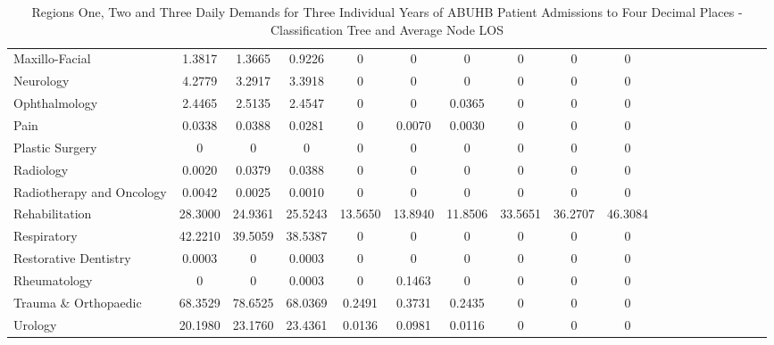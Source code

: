 \documentclass[thesis.tex]{subfiles}
\begin{document}
\begin{landscape}
\begin{table}[h!]
{\begin{tabular}{lcccccccccccccccccc}
Maxillo-Facial&	1.3817&	1.3665&	0.9226&	0&	0&	0	&0&	0	&0\\
Neurology&	4.2779&	3.2917	&3.3918&	0	&0&	0&	0&	0&	0\\
Ophthalmology	&2.4465&	2.5135	&2.4547	&0	&0	&0.0365	&0	&0&	0\\
Pain&	0.0338	&0.0388&	0.0281	&0	&0.0070	&0.0030	&0	&0	&0\\
Plastic Surgery	&0	&0	&0	&0	&0	&0	&0	&0&	0\\
Radiology&	0.0020	&0.0379	&0.0388&	0&	0&	0&	0	&0	&0\\
Radiotherapy and Oncology&	0.0042&	0.0025	&0.0010&	0&	0&	0	&0	&0	&0\\
Rehabilitation&	28.3000	&24.9361	&25.5243	&13.5650&	13.8940	&11.8506	&33.5651	&36.2707	&46.3084\\
Respiratory&	42.2210&	39.5059&	38.5387&	0&	0&	0&	0	&0&	0\\
Restorative Dentistry	&0.0003&	0&	0.0003	&0	&0	&0&	0	&0	&0\\
Rheumatology	&0&	0	&0.0003&0&	0.1463&	0&	0&	0&	0\\
Trauma \& Orthopaedic&	68.3529&	78.6525	&68.0369&	0.2491&	0.3731	&0.2435&	0&	0&	0\\
Urology	&20.1980&	23.1760&	23.4361	&0.0136	&0.0981&	0.0116	&0	&0	&0\\\bottomrule
    \end{tabular}  } 
\caption{Regions One, Two and Three Daily Demands for Three Individual Years of ABUHB Patient Admissions to Four Decimal Places - Classification Tree and Average Node LOS}
    \label{apptab:LinkedDemands7a}
\end{table}


   \begin{table}[h!]
    \centering{}
\end{table}
\end{landscape}
\end{document}
